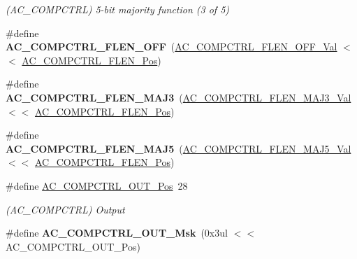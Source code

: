 \begin{DoxyCompactItemize}
\begin{DoxyCompactList}\small\item\em (A\+C\+\_\+\+C\+O\+M\+P\+C\+T\+R\+L) 5-\/bit majority function (3 of 5) \end{DoxyCompactList}\item 
\hypertarget{group___s_a_m_l21___a_c_ga0f010ce2ce3945d6d36ac829c151890f}{}\#define {\bfseries A\+C\+\_\+\+C\+O\+M\+P\+C\+T\+R\+L\+\_\+\+F\+L\+E\+N\+\_\+\+O\+F\+F}~(\hyperlink{group___s_a_m_l21___a_c_ga724ff78f629c59a482f3318c76dca04e}{A\+C\+\_\+\+C\+O\+M\+P\+C\+T\+R\+L\+\_\+\+F\+L\+E\+N\+\_\+\+O\+F\+F\+\_\+\+Val}      $<$$<$ \hyperlink{group___s_a_m_l21___a_c_ga66181eff5fbbb90049f3aae3b27b5a62}{A\+C\+\_\+\+C\+O\+M\+P\+C\+T\+R\+L\+\_\+\+F\+L\+E\+N\+\_\+\+Pos})\label{group___s_a_m_l21___a_c_ga0f010ce2ce3945d6d36ac829c151890f}

\item 
\hypertarget{group___s_a_m_l21___a_c_ga23b071c0451d67ea280455fd8e64ce50}{}\#define {\bfseries A\+C\+\_\+\+C\+O\+M\+P\+C\+T\+R\+L\+\_\+\+F\+L\+E\+N\+\_\+\+M\+A\+J3}~(\hyperlink{group___s_a_m_l21___a_c_ga7e847b79ecfd83187149193ecaead562}{A\+C\+\_\+\+C\+O\+M\+P\+C\+T\+R\+L\+\_\+\+F\+L\+E\+N\+\_\+\+M\+A\+J3\+\_\+\+Val}     $<$$<$ \hyperlink{group___s_a_m_l21___a_c_ga66181eff5fbbb90049f3aae3b27b5a62}{A\+C\+\_\+\+C\+O\+M\+P\+C\+T\+R\+L\+\_\+\+F\+L\+E\+N\+\_\+\+Pos})\label{group___s_a_m_l21___a_c_ga23b071c0451d67ea280455fd8e64ce50}

\item 
\hypertarget{group___s_a_m_l21___a_c_ga084aaecc35c3639095c3353e4903a530}{}\#define {\bfseries A\+C\+\_\+\+C\+O\+M\+P\+C\+T\+R\+L\+\_\+\+F\+L\+E\+N\+\_\+\+M\+A\+J5}~(\hyperlink{group___s_a_m_l21___a_c_gaaf4628cdfeb3c447df3cab7adf2665a8}{A\+C\+\_\+\+C\+O\+M\+P\+C\+T\+R\+L\+\_\+\+F\+L\+E\+N\+\_\+\+M\+A\+J5\+\_\+\+Val}     $<$$<$ \hyperlink{group___s_a_m_l21___a_c_ga66181eff5fbbb90049f3aae3b27b5a62}{A\+C\+\_\+\+C\+O\+M\+P\+C\+T\+R\+L\+\_\+\+F\+L\+E\+N\+\_\+\+Pos})\label{group___s_a_m_l21___a_c_ga084aaecc35c3639095c3353e4903a530}

\item 
\hypertarget{group___s_a_m_l21___a_c_ga6dfe864873a0eadaba8922ecf4b25ed1}{}\#define \hyperlink{group___s_a_m_l21___a_c_ga6dfe864873a0eadaba8922ecf4b25ed1}{A\+C\+\_\+\+C\+O\+M\+P\+C\+T\+R\+L\+\_\+\+O\+U\+T\+\_\+\+Pos}~28\label{group___s_a_m_l21___a_c_ga6dfe864873a0eadaba8922ecf4b25ed1}

\begin{DoxyCompactList}\small\item\em (A\+C\+\_\+\+C\+O\+M\+P\+C\+T\+R\+L) Output \end{DoxyCompactList}\item 
\hypertarget{group___s_a_m_l21___a_c_gac67e6aac29e4b0d2177f48f1870e2350}{}\#define {\bfseries A\+C\+\_\+\+C\+O\+M\+P\+C\+T\+R\+L\+\_\+\+O\+U\+T\+\_\+\+Msk}~(0x3ul $<$$<$ A\+C\+\_\+\+C\+O\+M\+P\+C\+T\+R\+L\+\_\+\+O\+U\+T\+\_\+\+Pos)\label{group___s_a_m_l21___a_c_gac67e6aac29e4b0d2177f48f1870e2350}


\end{DoxyCompactItemize}

